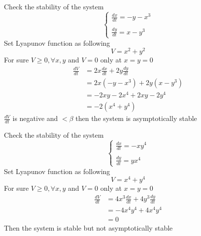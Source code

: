 \begin{example}
    Check the stability of the system
    \begin{equation*}
        \begin{cases}
            \displaystyle \frac{dx}{dt} = -y -x^3
            \\\\
            \displaystyle \frac{dy}{dt} = x -y^3
        \end{cases}
    \end{equation*}
    Set Lyapunov function as following
    \[
        V = x^2 + y^2
    \]
    For sure $V \geq 0 , \forall x,y$ and $V = 0$ only at $x=y=0 $
    \begin{align*}
        \frac{dV}{dt} & = 2x \frac{dx}{dt} + 2y \frac{dy}{dt}
        \\
                      & = 2x (-y -x^3) + 2y(x -y^3)
        \\
                      & = -2xy -2x^4 +2xy -2y^4
        \\
                      & = -2 (x^4 + y^4)
    \end{align*}
    $\displaystyle \frac{dV}{dt}$ is negative and $< \beta $ then the system is asymptotically stable
\end{example}
\newpage
\begin{example}
    Check the stability of the system
    \begin{equation*}
        \begin{cases}
            \displaystyle \frac{dx}{dt} = -xy^4
            \\\\
            \displaystyle \frac{dy}{dt} = yx^4
        \end{cases}
    \end{equation*}
    Set Lyapunov function as following
    \[
        V = x^4 + y^4
    \]
    For sure $V \geq 0 , \forall x,y$ and $V = 0$ only at $x=y=0 $
    \begin{align*}
        \frac{dV}{dt} & = 4x^3 \frac{dx}{dt} + 4y^3 \frac{dy}{dt}
        \\
                      & = -4x^4y^4 + 4x^4y^4
        \\
                      & = 0
    \end{align*}
    Then the system is stable but not asymptotically stable
\end{example}
